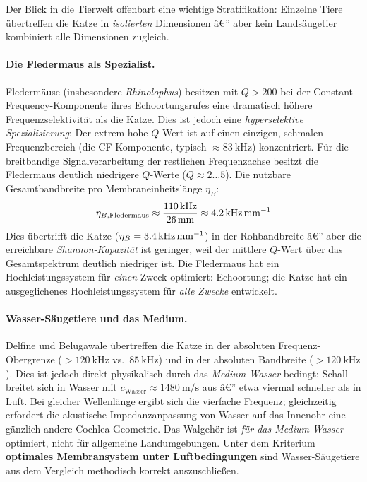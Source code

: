﻿\documentclass[12pt,a4paper,titlepage]{report}
\begin{document}
Der Blick in die Tierwelt offenbart eine wichtige Stratifikation: Einzelne Tiere
übertreffen die Katze in \emph{isolierten} Dimensionen â€” aber kein Landsäugetier
kombiniert alle Dimensionen zugleich.

\paragraph{Die Fledermaus als Spezialist.}
Fledermäuse (insbesondere \textit{Rhinolophus}) besitzen mit $Q > 200$ bei
der Constant-Frequency-Komponente ihres Echoortungsrufes eine dramatisch höhere
Frequenzselektivität als die Katze. Dies ist jedoch eine \emph{hyperselektive
Spezialisierung}: Der extrem hohe $Q$-Wert ist auf einen einzigen, schmalen
Frequenzbereich (die CF-Komponente, typisch $\approx \SI{83}{\kilo\hertz}$)
konzentriert. Für die breitbandige Signalverarbeitung der restlichen
Frequenzachse besitzt die Fledermaus deutlich niedrigere $Q$-Werte
($Q \approx 2 \ldots 5$).
Die nutzbare Gesamtbandbreite pro Membraneinheitslänge $\eta_B$:
\[
  \eta_{B,\text{Fledermaus}} \approx \frac{\SI{110}{\kilo\hertz}}{\SI{26}{\milli\meter}}
  \approx \SI{4{,}2}{\kilo\hertz\per\milli\meter}
\]
Dies übertrifft die Katze ($\eta_B = \SI{3{,}4}{\kilo\hertz\per\milli\meter}$) in der
Rohbandbreite â€” aber die erreichbare \emph{Shannon-Kapazität} ist geringer, weil
der mittlere $Q$-Wert über das Gesamtspektrum deutlich niedriger ist.
Die Fledermaus hat ein Hochleistungssystem für \emph{einen} Zweck optimiert:
Echoortung; die Katze hat ein ausgeglichenes Hochleistungssystem für
\emph{alle Zwecke} entwickelt.

\paragraph{Wasser-Säugetiere und das Medium.}
Delfine und Belugawale übertreffen die Katze in der absoluten Frequenz-Obergrenze
($> \SI{120}{\kilo\hertz}$ vs.\ $\SI{85}{\kilo\hertz}$) und in der absoluten
Bandbreite ($> \SI{120}{\kilo\hertz}$).
Dies ist jedoch direkt physikalisch durch das \emph{Medium Wasser} bedingt:
Schall breitet sich in Wasser mit $c_{\text{Wasser}} \approx \SI{1480}{\meter\per\second}$
aus â€” etwa viermal schneller als in Luft. Bei gleicher Wellenlänge ergibt sich
die vierfache Frequenz; gleichzeitig erfordert die akustische Impedanzanpassung
von Wasser auf das Innenohr eine gänzlich andere Cochlea-Geometrie.
Das Walgehör ist \emph{für das Medium Wasser} optimiert, nicht für allgemeine
Landumgebungen.
Unter dem Kriterium \textbf{optimales Membransystem unter Luftbedingungen} sind
Wasser-Säugetiere aus dem Vergleich methodisch korrekt auszuschließen.
\end{document}
